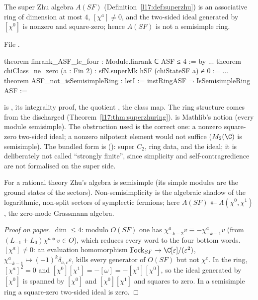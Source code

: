 \begin{theorem}\label{l17:thm:sfzhu}
The super Zhu algebra $A(SF)$ (Definition~\ref{l17:def:superzhu}) is an associative ring of dimension
at most $4$, $[\chi^a]\neq0$, and the two-sided ideal generated by $[\chi^0]$ is nonzero and
square-zero; hence $A(SF)$ is not a semisimple ring.
\end{theorem}
\noindent File .
\begin{leancode}
theorem finrank_ASF_le_four : Module.finrank ℂ ASF ≤ 4 := by
...
theorem chiClass_ne_zero (a : Fin 2) : sfN.superMk hSF (chiStateSF a) ≠ 0 :=
...
theorem ASF_not_isSemisimpleRing :
    letI := instRingASF
    ¬ IsSemisimpleRing ASF :=
\end{leancode}
\begin{dictionary}
 is ,  its integrality proof,  the
quotient ,  the class map. The ring structure 
comes from the discharged  (Theorem~\ref{l17:thm:superzhuring}).
 is Mathlib's notion (every module semisimple). The obstruction used is the
correct one: a nonzero square-zero two-sided ideal; a nonzero nilpotent element would not suffice
($M_2(\C)$ is semisimple). The bundled form is 
(): super $C_2$, ring data, and the ideal; it is
deliberately not called ``strongly finite'', since simplicity and self-contragredience are not
formalised on the super side.
\end{dictionary}
\begin{physics}
For a rational theory Zhu's algebra is semisimple (its simple modules are the ground states of the
sectors). Non-semisimplicity is the algebraic shadow of the logarithmic, non-split sectors of
symplectic fermions; here $A(SF)\twoheadleftarrow\Lambda(\chi^0,\chi^1)$, the zero-mode Grassmann
algebra.
\end{physics}
\begin{proof}[Proof on paper]
$\dim\le4$: modulo $O(SF)$ one has $\chi^a_{-k-2}v\equiv-\chi^a_{-k-1}v$ (from $(L_{-1}+L_0)\chi^a\ast v\in O$),
which reduces every word to the four bottom words. $[\chi^a]\neq0$: an evaluation homomorphism
$\mathrm{Fock}_{SF}\to\C[\varepsilon]/(\varepsilon^2)$, $\chi^a_{-k-1}\mapsto(-1)^k\delta_{a,c}\varepsilon$,
kills every generator of $O(SF)$ but not $\chi^c$. In the ring, $[\chi^a]^2=0$ and
$[\chi^0][\chi^1]=-[\omega]=-[\chi^1][\chi^0]$, so the ideal generated by $[\chi^0]$ is spanned by
$[\chi^0]$ and $[\chi^0][\chi^1]$ and squares to zero. In a semisimple ring a square-zero two-sided
ideal is zero.
\end{proof}
